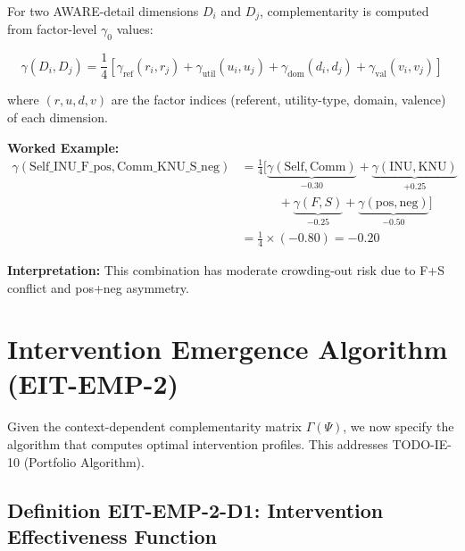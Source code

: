 \begin{tcolorbox}[colback=green!5!white, colframe=green!75!black,
    title=\textbf{Algorithm EIT-EMP-1-A1: Detail Gamma Computation}]

For two AWARE-detail dimensions $D_i$ and $D_j$, complementarity is computed from factor-level $\gamma_0$ values:

\begin{equation}
\gamma(D_i, D_j) = \frac{1}{4} \left[ \gamma_{\text{ref}}(r_i, r_j) + \gamma_{\text{util}}(u_i, u_j) + \gamma_{\text{dom}}(d_i, d_j) + \gamma_{\text{val}}(v_i, v_j) \right]
\end{equation}

where $(r, u, d, v)$ are the factor indices (referent, utility-type, domain, valence) of each dimension.

\textbf{Worked Example:}
\begin{align*}
\gamma(\text{Self\_INU\_F\_pos}, \text{Comm\_KNU\_S\_neg}) &= \frac{1}{4} \Big[ \underbrace{\gamma(\text{Self}, \text{Comm})}_{-0.30} + \underbrace{\gamma(\text{INU}, \text{KNU})}_{+0.25} \\
&\qquad\quad + \underbrace{\gamma(F, S)}_{-0.25} + \underbrace{\gamma(\text{pos}, \text{neg})}_{-0.50} \Big] \\
&= \frac{1}{4} \times (-0.80) = -0.20
\end{align*}

\textbf{Interpretation:} This combination has moderate crowding-out risk due to F+S conflict and pos+neg asymmetry.

\end{tcolorbox}

\section{Intervention Emergence Algorithm (EIT-EMP-2)}
\label{sec:ie-emerge-algorithm}

Given the context-dependent complementarity matrix $\Gamma(\Psi)$, we now specify the algorithm that computes optimal intervention profiles. This addresses TODO-IE-10 (Portfolio Algorithm).

\subsection{Definition EIT-EMP-2-D1: Intervention Effectiveness Function}
\label{subsec:effectiveness-function}

